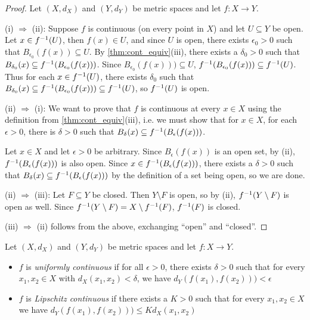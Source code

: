 \documentclass{article}
\begin{document}
\begin{proof}
Let $(X,d_X)$ and $(Y,d_Y)$ be metric spaces and let $f:X\to Y$.

(i) $\Rightarrow$ (ii): Suppose $f$ is continuous (on every point in $X$) and let $U \subseteq Y$ be open. Let $x \in f^{-1}(U)$, then $f(x) \in U$, and since $U$ is open, there exists $\epsilon_0 > 0$ such that $B_{\epsilon_0}(f(x)) \subseteq U$. By \cref{thm:cont_equiv}(iii), there exists a $\delta_0 > 0$ such that $B_{\delta_0}(x) \subseteq f^{-1} (B_{\epsilon_0}(f(x)))$. Since $B_{\epsilon_0}(f(x))) \subseteq U$, $f^{-1} (B_{\epsilon_0}(f(x))) \subseteq f^{-1}(U)$. Thus for each $x \in f^{-1}(U)$, there exists $\delta_0$ such that $B_{\delta_0}(x) \subseteq f^{-1} (B_{\epsilon_0}(f(x))) \subseteq f^{-1}(U)$, so $f^{-1}(U)$ is open.

(ii) $\Rightarrow$ (i): We want to prove that $f$ is continuous at every $x \in X$ using the definition from \cref{thm:cont_equiv}(iii), i.e. we must show that for $x \in X$, for each $\epsilon>0$, there is $\delta > 0$ such that $B_\delta(x) \subseteq f^{-1} (B_\epsilon(f(x)))$. 

Let $x\in X$ and let $\epsilon > 0$ be arbitrary. Since $B_\epsilon(f(x))$ is an open set, by (ii), $f^{-1}(B_\epsilon(f(x)))$ is also open. Since $x \in f^{-1}(B_\epsilon(f(x)))$, there exists a $\delta > 0$ such that $B_\delta(x) \subseteq f^{-1}(B_\epsilon(f(x)))$ by the definition of a set being open, so we are done.

(ii) $\Rightarrow$ (iii): Let $F \subseteq Y$ be closed. Then $Y \setminus F$ is open, so by (ii), $f^{-1}(Y \setminus F)$ is open as well. Since $f^{-1}(Y \setminus F) = X\setminus f^{-1}(F)$, $f^{-1}(F)$ is closed.

(iii) $\Rightarrow$ (ii) follows from the above, exchanging ``open'' and ``closed''.
\end{proof}


\begin{definition}
\label{def:Lip_unif}
Let $(X,d_X)$ and $(Y,d_Y)$ be metric spaces and let $f:X\to Y$. 
\begin{itemize}
    \item $f$ is \emph{uniformly continuous} if for all $\epsilon>0$, there exists $\delta > 0$ such that for every $x_1,x_2\in X$ with $d_X(x_1,x_2) < \delta$, we have  $d_Y(f(x_1),f(x_2))) < \epsilon$ 
    \item $f$ is \emph{Lipschitz continuous} if there exists a $K > 0$ such that for every $x_1,x_2\in X$ we have  $d_Y(f(x_1),f(x_2))) \leq K d_X(x_1,x_2)$
\end{itemize}
\end{definition}
\end{document}
